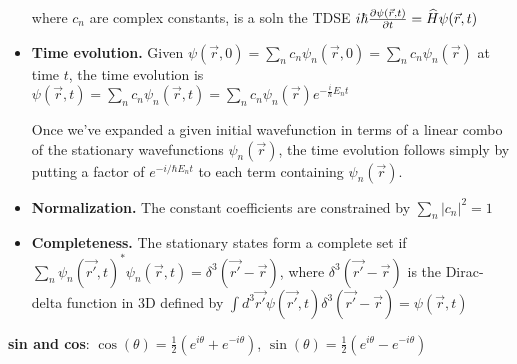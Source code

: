 \begin{itemize}[noitemsep,wide=0pt, leftmargin=\dimexpr{} + 2\relax]
            \vspace{-5px}
        
            where $c_n$ are complex constants, is a soln the TDSE 
        $i \hbar \pdv{\psi(\vec{r}, t)}{t} = \widehat{H} \psi(\vec{r}, t)$

    \item \textbf{Time evolution.}
        Given $\psi(\vec{r}, 0) = \sum_n c_n \psi_n(\vec{r}, 0) = \sum_n c_n \psi_n (\vec{r})$
        at time $t$, the time evolution is 
        $\psi(\vec{r}, t) = \sum_n c_n \psi_n(\vec{r}, t) = \sum_n c_n \psi_n(\vec{r}) e^{-\frac{i}{\hbar} E_n t}$

        Once we've expanded a given initial wavefunction in terms of a linear combo of the stationary wavefunctions $\psi_n(\vec{r})$, the time evolution follows simply by putting a factor of $e^{-i/\hbar E_n t}$ to each term containing $\psi_n(\vec{r})$.

    \item \textbf{Normalization.}
        The constant coefficients are constrained by $\sum_n |c_n|^2 = 1$

    \item \textbf{Completeness.}
        The stationary states form a complete set if $\sum_n \psi_n (\vec{r'}, t)^* \psi_{n} (\vec{r}, t) = \delta^3 (\vec{r'} - \vec{r})$, where $\delta^3(\vec{r'} - \vec{r})$ is the Dirac-delta function in 3D defined by $\int d^3 \vec{r'} \psi(\vec{r'}, t) \delta^3(\vec{r'} - \vec{r}) = \psi(\vec{r}, t)$
\end{itemize}

\vspace{-10pt}

\textbf{sin and cos}: $\cos(\theta) = \frac{1}{2}(e^{i \theta} + e^{-i \theta})$, $\sin(\theta) = \frac{1}{2}(e^{i \theta} - e^{-i \theta})$ \\



